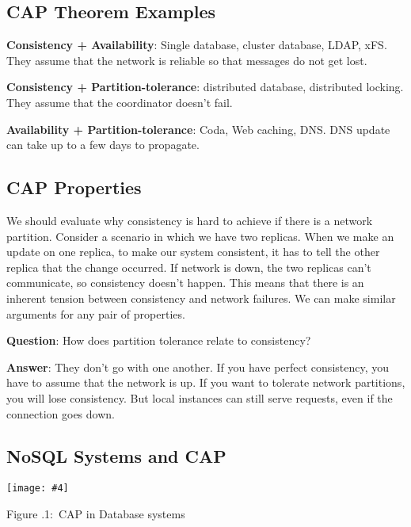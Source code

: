\documentclass[twoside]{article}
\newcounter{lecnum}
\newcommand{\fig}[4]{
            \centerline{\texttt{[image: \#4]}}
            \begin{center}
            Figure \thelecnum.#1:~#3
            \end{center}
    }
\begin{document}
\subsection{CAP Theorem Examples}

\begin{description}

    \item \textbf{Consistency + Availability}: Single database, cluster database, LDAP, xFS. They assume that the network is reliable so that messages do not get lost.
    
    \item \textbf{Consistency + Partition-tolerance}: distributed database, distributed locking. They assume that the coordinator doesn't fail.
    
    \item \textbf{Availability + Partition-tolerance}: Coda, Web caching, DNS. DNS update can take up to a few days to propagate.
    
\end{description}

\subsection{CAP Properties}

We should evaluate why consistency is hard to achieve if there is a network partition. Consider a scenario in which we have two replicas. When we make an update on one replica, to make our system consistent, it has to tell the other replica that the change occurred. If network is down, the two replicas can't communicate, so consistency doesn't happen. This means that there is an inherent tension between consistency and network failures. We can make similar arguments for any pair of properties.

\textbf{Question}: How does partition tolerance relate to consistency?

\textbf{Answer}: They don’t go with one another. If you have perfect consistency, you have to assume that the network is up. If you want to tolerate network partitions, you will lose consistency. But local instances can still serve requests, even if the connection goes down.

\subsection{NoSQL Systems and CAP}

\fig{1}{0.2}{CAP in Database systems}{nosql}
\end{document}
